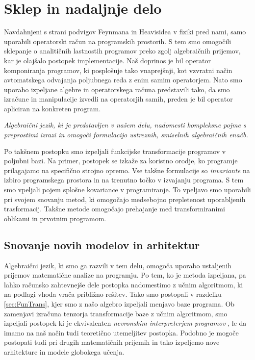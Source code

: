 \documentclass[a4paper, 12pt]{book}
\begin{document}
\chapter{Sklep in nadaljnje delo} \label{ch:zakSklp}

Navdahnjeni s strani podvigov Feynmana \cite{Feynman} in Heavisidea \cite{HeavisideOperational} v fiziki pred nami, samo uporabili operatorski račun na programskih prostorih. S tem smo omogočili sklepanje o analitičnih lastnostih programov preko zgolj algebraičnih prijemov, kar je olajšalo postopek implementacije. Naš doprinos je bil operator komponiranja programov, ki posplošuje tako vnaprejšnji, kot vzvratni način avtomatskega odvajanja poljubnega reda z enim samim operatorjem. Nato smo uporabo izpeljane algebre in operatorskega računa predstavili tako, da smo izračune in manipulacije izvedli na operatorjih samih, preden je bil operator apliciran na konkreten program. 

\emph{Algebraični jezik, ki je predstavljen v našem delu, nadomesti kompleksne pojme s preprostimi izrazi in omogoči formulacijo ustreznih, smiselnih algebraičnih enačb.} 

Po takšnem postopku smo izpeljali funkcijske transformacije programov v poljubni bazi. Na primer, postopek se izkaže za koristno orodje, ko programje prilagajamo na specifično strojno opremo. Vse takšne formulacije so \emph{invariante} na izbiro programskega prostora in na trenutno točko v izvajanju programa. S tem smo vpeljali pojem splošne kovariance v programiranje. To vpeljavo smo uporabili pri svojem snovanju metod, ki omogočajo medsebojno prepletenost uporabljenih trasformacij. Takšne metode omogočajo prehajanje med transformiranimi oblikami in prvotnim programom.

\section{Snovanje novih modelov in arhitektur}

Algebraični jezik, ki smo ga razvili v tem delu, omogoča uporabo ustaljenih prijemov matematične analize na programju. Po tem, ko je metoda izpeljana, pa lahko računsko zahtevnejše dele postopka nadomestimo z učnim algoritmom, ki na podlagi vhoda vrača približno rešitev. Tako smo postopali v razdelku \ref{sec:FunTrans}, kjer smo z našo algebro izpeljali menjavo baze programa. Ob zamenjavi izračuna tenzorja transformacije baze z učnim algoritmom, smo izpeljali postopek ki je ekvivalenten \emph{nevronskim interpreterjem programov} \cite{progInterp}, le da imamo na naš način tudi teoretično utemeljitev postopka. Podobno je mogoče postopati tudi pri drugih matematičnih prijemih in tako izpeljemo nove arhitekture in modele globokega učenja.
\end{document}
